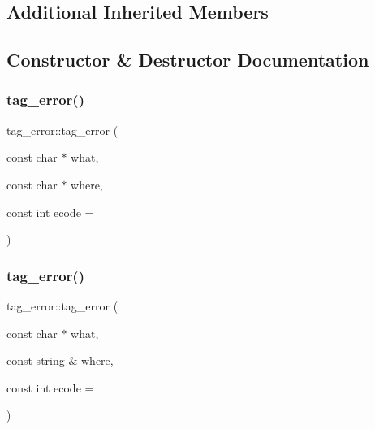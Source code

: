 \subsection*{Additional Inherited Members}


\subsection{Constructor \& Destructor Documentation}
\mbox{\label{classtag__error_a49b7eb59916bbc065f7d79bbf31cb460}} 
\subsubsection{\texorpdfstring{tag\+\_\+error()}{tag\_error()}\hspace{0.1cm}{\footnotesize\ttfamily [1/4]}}
{\footnotesize\ttfamily tag\+\_\+error\+::tag\+\_\+error (\begin{DoxyParamCaption}\item[{const char $\ast$}]{what,  }\item[{const char $\ast$}]{where,  }\item[{const int}]{ecode = {} }\end{DoxyParamCaption})}

\mbox{\label{classtag__error_abc7794a3cf421776f77b781b4bef9dfb}} 
\subsubsection{\texorpdfstring{tag\+\_\+error()}{tag\_error()}\hspace{0.1cm}{\footnotesize\ttfamily [2/4]}}
{\footnotesize\ttfamily tag\+\_\+error\+::tag\+\_\+error (\begin{DoxyParamCaption}\item[{const char $\ast$}]{what,  }\item[{const string \&}]{where,  }\item[{const int}]{ecode = {} }\end{DoxyParamCaption})}

\mbox{\label{classtag__error_afc103fa30ef508088c2cb4eda60837d2}} 
